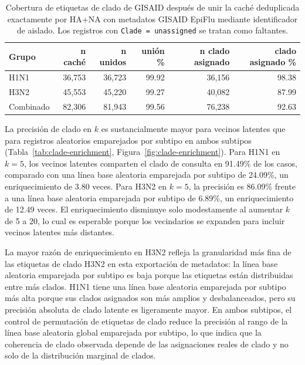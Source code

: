 \documentclass[11pt]{article}
\begin{document}
\begin{table}[H]
\centering
\caption{Cobertura de etiquetas de clado de GISAID después de unir la caché deduplicada exactamente por HA+NA con metadatos GISAID EpiFlu mediante identificador de aislado. Los registros con \texttt{Clade = unassigned} se tratan como faltantes.}
\label{tab:clade-coverage}
\begin{tabular}{lrrrrr}
\toprule
Grupo & n caché & n unidos & unión \% & n clado asignado & clado asignado \% \\
\midrule
H1N1 & 36,753 & 36,723 & 99.92 & 36,156 & 98.38 \\
H3N2 & 45,553 & 45,220 & 99.27 & 40,082 & 87.99 \\
Combinado & 82,306 & 81,943 & 99.56 & 76,238 & 92.63 \\
\bottomrule
\end{tabular}
\end{table}

La precisión de clado en $k$ es sustancialmente mayor para vecinos latentes que para registros aleatorios emparejados por subtipo en ambos subtipos (Tabla~\ref{tab:clade-enrichment}, Figura~\ref{fig:clade-enrichment}). Para H1N1 en $k=5$, los vecinos latentes comparten el clado de consulta en 91.49\% de los casos, comparado con una línea base aleatoria emparejada por subtipo de 24.09\%, un enriquecimiento de 3.80 veces. Para H3N2 en $k=5$, la precisión es 86.09\% frente a una línea base aleatoria emparejada por subtipo de 6.89\%, un enriquecimiento de 12.49 veces. El enriquecimiento disminuye solo modestamente al aumentar $k$ de 5 a 20, lo cual es esperable porque los vecindarios se expanden para incluir vecinos latentes más distantes.

La mayor razón de enriquecimiento en H3N2 refleja la granularidad más fina de las etiquetas de clado H3N2 en esta exportación de metadatos: la línea base aleatoria emparejada por subtipo es baja porque las etiquetas están distribuidas entre más clados. H1N1 tiene una línea base aleatoria emparejada por subtipo más alta porque sus clados asignados son más amplios y desbalanceados, pero su precisión absoluta de clado latente es ligeramente mayor. En ambos subtipos, el control de permutación de etiquetas de clado reduce la precisión al rango de la línea base aleatoria global emparejada por subtipo, lo que indica que la coherencia de clado observada depende de las asignaciones reales de clado y no solo de la distribución marginal de clados.
\end{document}
